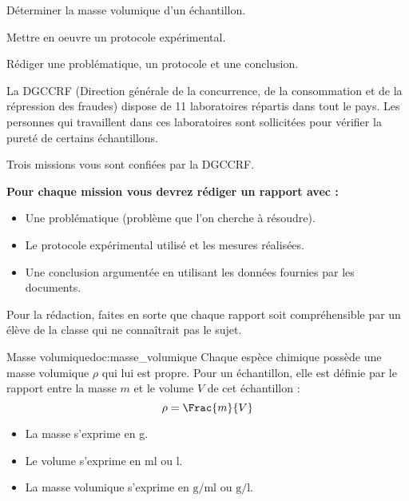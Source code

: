 \teteSndCorp




\begin{objectifs}
  \item Déterminer la masse volumique d'un échantillon.
  \item Mettre en oeuvre un protocole expérimental.
  \item Rédiger une problématique, un protocole et une conclusion.
\end{objectifs}


\begin{contexte}
  La \textsf{DGCCRF} (Direction générale de la concurrence, de la consommation et de la répression des fraudes) dispose de 11 laboratoires répartis dans tout le pays. 
  Les personnes qui travaillent dans ces laboratoires sont sollicitées pour vérifier la pureté de certains échantillons.
  
  Trois missions vous sont confiées par la \textsf{DGCCRF}.
\end{contexte}

\textbf{\large \fleche Pour chaque mission vous devrez rédiger un rapport avec :}
\begin{itemize}
  \item Une problématique (problème que l'on cherche à résoudre).
  \item Le protocole expérimental utilisé et les mesures réalisées.
  \item Une conclusion argumentée en utilisant les données fournies par les documents.
\end{itemize}
{\large \fleche} Pour la rédaction, faites en sorte que chaque rapport soit compréhensible par un élève de la classe qui ne connaîtrait pas le sujet.


\begin{doc}{Masse volumique}{doc:masse_volumique}
  Chaque espèce chimique possède une masse volumique $\rho$ qui lui est propre.
  Pour un échantillon, elle est définie par le rapport entre la masse $m$ et le volume $V$ de cet échantillon : 
  \begin{equation*}
    \rho = \Frac{m}{V}
  \end{equation*}
  \begin{itemize}
      \item La masse s'exprime en \unit{\g}.
      \item Le volume s'exprime en \unit{\ml} ou $\unit{\litre}$.
      \item La masse volumique s'exprime en $\unit{\g/\ml}$ ou $\unit{\g/\litre}$.
  \end{itemize}
\end{doc}

